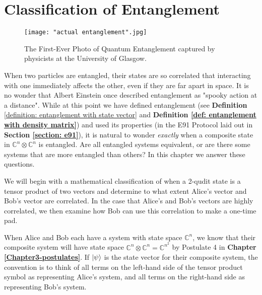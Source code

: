 
\chapter{Classification of Entanglement} %

\label{Chapter6-classification of entanglement} %
\begin{figure}[h]
    \centering
    \texttt{[image: "actual entanglement".jpg]}
    \caption{The First-Ever Photo of Quantum Entanglement captured by physicists at the University of Glasgow. \cite{moreau2019imaging}}
    \label{fig:actual entanglemen}
\end{figure}

When two particles are entangled, their states are so correlated that interacting with one immediately affects the other, even if they are far apart in space.  It is no wonder that Albert Einstein once described entanglement as "spooky action at a distance". While at this point we have defined entanglement (see {\bf{Definition}} \ref{definition: entanglement with state vector} and \textbf{Definition \ref{def: entanglement with density matrix}}) and used its properties (in the E91 Protocol laid out in \textbf{Section \ref{section: e91}}), it is natural to wonder {\emph{exactly}} when a composite state in $\mathbb{C}^n \otimes \mathbb{C}^n$ is entangled.
Are all entangled systems equivalent, or are there some systems that are more entangled than others? In this chapter we answer these questions.


We will begin with a mathematical classification of when a 2-qudit state is a tensor product of two vectors and determine to what extent Alice's vector and Bob's vector are correlated. In the case that Alice's and Bob's vectors are highly correlated, we then examine how Bob can use this correlation to make a one-time pad. 


When Alice and Bob each have a system with state space ${\mathbb{C}}^n$, we know that their composite system will have state space ${\mathbb{C}}^n \otimes {\mathbb{C}}^n={\mathbb{C}}^{n^2}$ by Postulate 4 in \textbf{Chapter \ref{Chapter3-postulates}}. If $\ket{\psi}$ is the state vector for their composite system, the convention is to think of all terms on the left-hand side of the tensor product symbol as representing Alice's system, and all terms on the right-hand side as representing Bob's system.  

